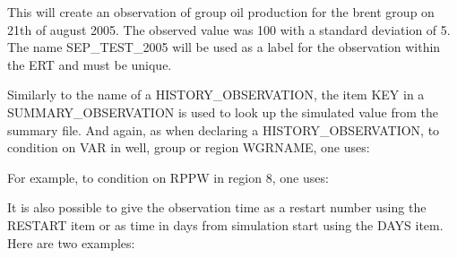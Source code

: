 \documentclass[a4paper,10pt,english]{sphinxmanual}
\begin{document}
This will create an observation of group oil production for the brent
group on 21th of august 2005. The observed value was 100 with a
standard deviation of 5. The name SEP\_TEST\_2005 will be used as a
label for the observation within the ERT and must be unique.

Similarly to the name of a HISTORY\_OBSERVATION, the item KEY in a
SUMMARY\_OBSERVATION is used to look up the simulated value from the
summary file. And again, as when declaring a HISTORY\_OBSERVATION, to
condition on VAR in well, group or region WGRNAME, one uses:

%
\begin{sphinxVerbatim}[commandchars=\\\{\}]
  
\end{sphinxVerbatim}

For example, to condition on RPPW in region 8, one uses:

%
\begin{sphinxVerbatim}[commandchars=\\\{\}]
  
\end{sphinxVerbatim}

It is also possible to give the observation time as a restart number
using the RESTART item or as time in days from simulation start using
the DAYS item. Here are two examples:

%
\begin{sphinxVerbatim}[commandchars=\\\{\}]
         
 
        
          
       
          


        
   
 
        
         
         
          
\end{sphinxVerbatim}
\end{document}
